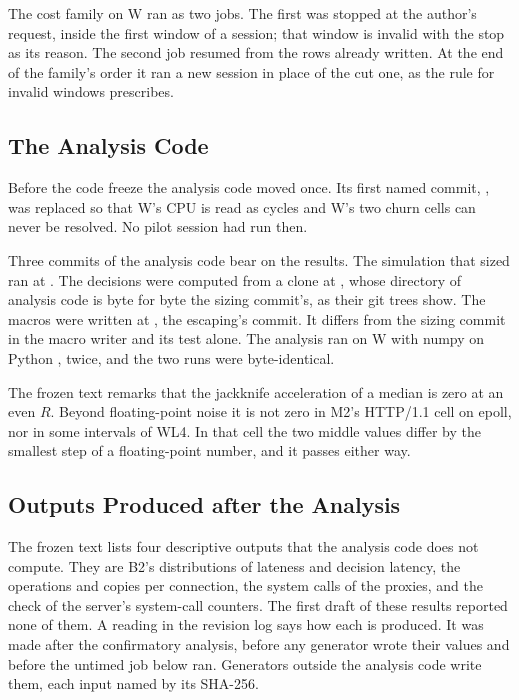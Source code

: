 The cost family on W ran as two jobs. The first was stopped at the author's request, inside the
first window of a session; that window is invalid with the stop as its reason. The second job
resumed from the rows already written. At the end of the family's order it ran a new session in
place of the cut one, as the rule for invalid windows prescribes.

\subsection{The Analysis Code}\label{sec:dev-analysis}

Before the code freeze the analysis code moved once. Its first named commit,
\hex{\AnalysisCommitFirst}, was replaced so that W's CPU is read as cycles and W's two churn cells can never be resolved. No
pilot session had run then.

Three commits of the analysis code bear on the results. The simulation that sized \RC{} ran at
\hex{\SizingCommit}. The decisions were computed from a clone at \hex{\AnalysisRunCommit}, whose
directory of analysis code is byte for byte the sizing commit's, as their git trees show. The
macros were written at \hex{\AnalysisCommit}, the escaping's commit. It differs from the sizing
commit in the macro writer and its test alone. The analysis ran on W with numpy \AnalysisNumpyW{} on
Python \AnalysisPythonW, twice, and the two runs were byte-identical.

The frozen text remarks that the jackknife acceleration of a median is zero at an even $R$. Beyond
floating-point noise it is not zero in M2's HTTP/1.1 cell on epoll, nor in some intervals of WL4.
In that cell the two middle values differ by the smallest step of a floating-point number, and it
passes either way.

\subsection{Outputs Produced after the Analysis}\label{sec:dev-not-produced}

The frozen text lists four descriptive outputs that the analysis code does not compute. They are
B2's distributions of lateness and decision latency, the operations and copies per connection, the
system calls of the proxies, and the check of the server's system-call counters. The first draft of
these results reported none of them. A reading in the revision log says how each is produced. It
was made after the confirmatory analysis, before any generator wrote their values and before the
untimed job below ran. Generators outside the analysis code write them, each input named by its
SHA-256.

